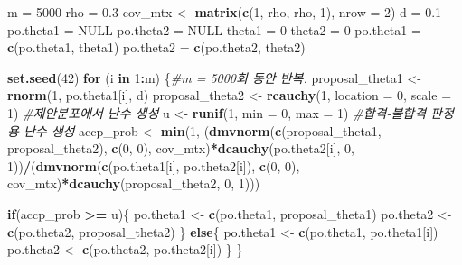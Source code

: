 \documentclass[
]{article}
\newenvironment{Shaded}{\begin{snugshade}}{\end{snugshade}}
\newcommand{\AttributeTok}[1]{\textcolor[rgb]{0.13,0.29,0.53}{#1}}
\newcommand{\CommentTok}[1]{\textcolor[rgb]{0.56,0.35,0.01}{\textit{#1}}}
\newcommand{\ConstantTok}[1]{\textcolor[rgb]{0.56,0.35,0.01}{#1}}
\newcommand{\ControlFlowTok}[1]{\textcolor[rgb]{0.13,0.29,0.53}{\textbf{#1}}}
\newcommand{\DecValTok}[1]{\textcolor[rgb]{0.00,0.00,0.81}{#1}}
\newcommand{\FloatTok}[1]{\textcolor[rgb]{0.00,0.00,0.81}{#1}}
\newcommand{\FunctionTok}[1]{\textcolor[rgb]{0.13,0.29,0.53}{\textbf{#1}}}
\newcommand{\NormalTok}[1]{#1}
\newcommand{\OtherTok}[1]{\textcolor[rgb]{0.56,0.35,0.01}{#1}}
\newcommand{\SpecialCharTok}[1]{\textcolor[rgb]{0.81,0.36,0.00}{\textbf{#1}}}
\begin{document}
\begin{Shaded}
\begin{Highlighting}[]
\NormalTok{m }\OtherTok{=} \DecValTok{5000}
\NormalTok{rho }\OtherTok{=} \FloatTok{0.3}
\NormalTok{cov\_mtx }\OtherTok{\textless{}{-}} \FunctionTok{matrix}\NormalTok{(}\FunctionTok{c}\NormalTok{(}\DecValTok{1}\NormalTok{, rho, rho, }\DecValTok{1}\NormalTok{), }\AttributeTok{nrow =} \DecValTok{2}\NormalTok{)}
\NormalTok{d }\OtherTok{=} \FloatTok{0.1}
\NormalTok{po.theta1 }\OtherTok{=} \ConstantTok{NULL}
\NormalTok{po.theta2 }\OtherTok{=} \ConstantTok{NULL}
\NormalTok{theta1 }\OtherTok{=} \DecValTok{0}
\NormalTok{theta2 }\OtherTok{=} \DecValTok{0}
\NormalTok{po.theta1 }\OtherTok{=} \FunctionTok{c}\NormalTok{(po.theta1, theta1)}
\NormalTok{po.theta2 }\OtherTok{=} \FunctionTok{c}\NormalTok{(po.theta2, theta2) }

\FunctionTok{set.seed}\NormalTok{(}\DecValTok{42}\NormalTok{)}
\ControlFlowTok{for}\NormalTok{ (i }\ControlFlowTok{in} \DecValTok{1}\SpecialCharTok{:}\NormalTok{m) \{}\CommentTok{\#m = 5000회 동안 반복.}
\NormalTok{  proposal\_theta1 }\OtherTok{\textless{}{-}} \FunctionTok{rnorm}\NormalTok{(}\DecValTok{1}\NormalTok{, po.theta1[i], d)}
\NormalTok{  proposal\_theta2 }\OtherTok{\textless{}{-}} \FunctionTok{rcauchy}\NormalTok{(}\DecValTok{1}\NormalTok{, }\AttributeTok{location =} \DecValTok{0}\NormalTok{, }\AttributeTok{scale =} \DecValTok{1}\NormalTok{) }\CommentTok{\#제안분포에서 난수 생성}
\NormalTok{  u }\OtherTok{\textless{}{-}} \FunctionTok{runif}\NormalTok{(}\DecValTok{1}\NormalTok{, }\AttributeTok{min =} \DecValTok{0}\NormalTok{, }\AttributeTok{max =} \DecValTok{1}\NormalTok{) }\CommentTok{\#합격{-}불합격 판정용 난수 생성}
\NormalTok{  accp\_prob }\OtherTok{\textless{}{-}} \FunctionTok{min}\NormalTok{(}\DecValTok{1}\NormalTok{, (}\FunctionTok{dmvnorm}\NormalTok{(}\FunctionTok{c}\NormalTok{(proposal\_theta1, proposal\_theta2), }\FunctionTok{c}\NormalTok{(}\DecValTok{0}\NormalTok{, }\DecValTok{0}\NormalTok{), cov\_mtx)}\SpecialCharTok{*}\FunctionTok{dcauchy}\NormalTok{(po.theta2[i], }\DecValTok{0}\NormalTok{, }\DecValTok{1}\NormalTok{))}\SpecialCharTok{/}\NormalTok{(}\FunctionTok{dmvnorm}\NormalTok{(}\FunctionTok{c}\NormalTok{(po.theta1[i], po.theta2[i]), }\FunctionTok{c}\NormalTok{(}\DecValTok{0}\NormalTok{, }\DecValTok{0}\NormalTok{), cov\_mtx)}\SpecialCharTok{*}\FunctionTok{dcauchy}\NormalTok{(proposal\_theta2, }\DecValTok{0}\NormalTok{, }\DecValTok{1}\NormalTok{)))}
  
  \ControlFlowTok{if}\NormalTok{(accp\_prob }\SpecialCharTok{\textgreater{}=}\NormalTok{ u)\{}
\NormalTok{    po.theta1 }\OtherTok{\textless{}{-}} \FunctionTok{c}\NormalTok{(po.theta1, proposal\_theta1)}
\NormalTok{    po.theta2 }\OtherTok{\textless{}{-}} \FunctionTok{c}\NormalTok{(po.theta2, proposal\_theta2)}
\NormalTok{  \} }\ControlFlowTok{else}\NormalTok{\{}
\NormalTok{    po.theta1 }\OtherTok{\textless{}{-}} \FunctionTok{c}\NormalTok{(po.theta1, po.theta1[i])}
\NormalTok{    po.theta2 }\OtherTok{\textless{}{-}} \FunctionTok{c}\NormalTok{(po.theta2, po.theta2[i])}
\NormalTok{  \}}
\NormalTok{\}}


\end{Highlighting}
\end{Shaded}
\end{document}
